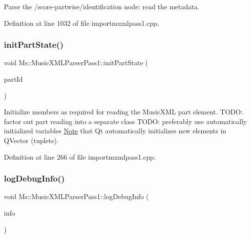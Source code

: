 Parse the /score-\/partwise/identification node\+: read the metadata. 

Definition at line 1032 of file importmxmlpass1.\+cpp.

\mbox{\label{class_ms_1_1_music_x_m_l_parser_pass1_a8cad35ac46557855c87e3e497f323d14}} 
\subsubsection{\texorpdfstring{init\+Part\+State()}{initPartState()}}
{\footnotesize\ttfamily void Ms\+::\+Music\+X\+M\+L\+Parser\+Pass1\+::init\+Part\+State (\begin{DoxyParamCaption}\item[{const Q\+String \&}]{part\+Id }\end{DoxyParamCaption})}

Initialize members as required for reading the Music\+X\+ML part element. T\+O\+DO\+: factor out part reading into a separate class T\+O\+DO\+: preferably use automatically initialized variables \hyperlink{class_ms_1_1_note}{Note} that Qt automatically initializes new elements in Q\+Vector (tuplets). 

Definition at line 266 of file importmxmlpass1.\+cpp.

\mbox{\label{class_ms_1_1_music_x_m_l_parser_pass1_a0a350619dbe0953dc37376f2ce630c8f}} 
\subsubsection{\texorpdfstring{log\+Debug\+Info()}{logDebugInfo()}}
{\footnotesize\ttfamily void Ms\+::\+Music\+X\+M\+L\+Parser\+Pass1\+::log\+Debug\+Info (\begin{DoxyParamCaption}\item[{const Q\+String \&}]{info }\end{DoxyParamCaption})}

